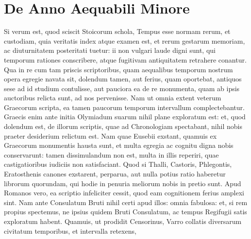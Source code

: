 

\chapter{De Anno Aequabili Minore}

Si verum est, quod sciscit Stoicorum
schola, Tempus esse normam rerum, et
custodiam, quia veritatis index atque examen
est, et rerum gestarum memoriam, ac
diuturnitatem posteritati tuetur: ii non vulgari
laude digni sunt, qui temporum rationes
conscribere, atque fugitivam antiquitatem
retrahere conantur.
Qua in re cum
tam priscis scriptoribus, quam aequalibus
temporum nostrum opera egregie navata sit, dolendum tamen, aut
ferius, quam oportebat, antiquos sese ad id studium contulisse, aut pauciora
ea de re monumenta, quam ab ipsis auctoribus relicta sunt, ad
nos pervenisse.
Nam ut omnia extent veterum Graecorum scripta, ea
tamen paucorum temporum intervallum complectebantur.
Graecis
enim ante initia Olymiadum suarum nihil plane exploratum est: et,
quod dolendum est, de illorum scriptis, quae ad Chronologiam spectabant,
nihil nobis praeter desiderium relictum est.
Nam quae Eusebii exstant,
quamuis ex Graecorum monumentis hausta sunt, et multa egregia
ac cognitu digna nobis conservarunt: tamen dissimulandum non est,
multa in illis reperiri, quae castigatioribus iudiciis non satisfaciant.
Quod si Thalli, Castoris, Phlegontis,
 Eratosthenis canones exstarent,
perparua, aut nulla potius ratio haberetur librorum quorundam, qui
hodie in penuria meliorum nobis in pretio sunt.
Apud Romanos vero,
ea scriptio infeliciter cessit, quod eam cognitionem ferius amplexi sint.
Nam ante Consulatum Bruti nihil certi apud illos: omnia fabulosa: et,
si rem propius spectemus, ne ipsius quidem Bruti Consulatum, ac tempus
Regifugii satis exploratum habent.
Quamuis, ut prodidit Censorinus,
Varro collatis diversarum civitatum temporibus, et intervalla retexens,
